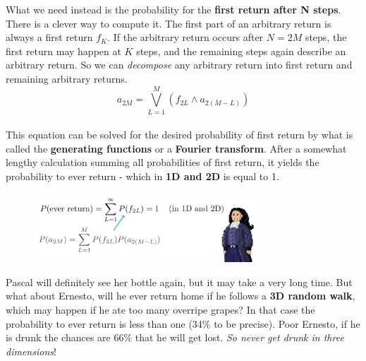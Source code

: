 \documentclass[12pt, a4paper]{scrartcl}
\begin{document}
What we need instead is the probability for the \textbf{first return after N steps}.
There is a clever way to compute it. The first part of an arbitrary return is always a first return $f_K$. If the arbitrary return occurs after $N = 2M$ steps, the first return may happen at $K$ steps, and the remaining steps again describe an arbitrary return.
So we can \textit{decompose} any arbitrary return into first return and remaining arbitrary returns.%
\begin{equation*}\boxed{a_{2M}=\bigvee_{L=1}^{M}(f_{2L}\wedge a_{2(M-L)})
}\end{equation*}\\
This equation can be solved for the desired probability of first return by what is called the \textbf{generating functions} or a \textbf{Fourier transform}. After a somewhat lengthy calculation summing all probabilities of first return, it yields the probability to ever return - which in \textbf{1D and 2D} is equal to 1.%
 \begin{figure}[H]
	\centering
	\includegraphics[width=0.75\textwidth]{5_6.png}
\end{figure}
Pascal will definitely see her bottle again, but it may take a very long time.
But what about Ernesto, will he ever return home if he follows a \textbf{3D random walk}, which may happen if he ate too many overripe grapes?
In that case the probability to ever return is less than one (34\% to be precise).
Poor Ernesto, if he is drunk the chances are 66\% that he will get lost.
\textit{So never get drunk in three dimensions}!\\
\end{document}
